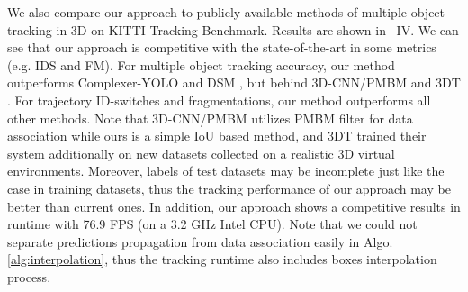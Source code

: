 \documentclass[letterpaper, 10pt, conference]{ieeeconf}  %
\begin{document}
We also compare our approach to publicly available methods of multiple object tracking in 3D on KITTI Tracking Benchmark. Results are shown in \tablename \, IV. We can see that our approach is competitive with the state-of-the-art in some metrics (e.g. IDS and FM). For multiple object tracking accuracy, our method outperforms Complexer-YOLO \cite{Simon_2019_CVPR_Workshops} and DSM \cite{frossard2018end}, but behind 3D-CNN/PMBM \cite{scheidegger2018mono} and 3DT \cite{Hu3DT19}. For trajectory ID-switches and fragmentations, our method outperforms all other methods. Note that 3D-CNN/PMBM utilizes PMBM filter for data association while ours is a simple IoU based method, and 3DT trained their system additionally on new datasets collected on a realistic 3D virtual environments. Moreover, labels of test datasets may be incomplete just like the case in training datasets, thus the tracking performance of our approach may be better than current ones. In addition, our approach shows a competitive results in runtime with 76.9 FPS (on a  3.2 GHz Intel CPU). Note that we could not separate predictions propagation from data association easily in Algo. \ref{alg:interpolation}, thus the tracking runtime also includes boxes interpolation process.
\begin{table}
	\caption*{TABLE III: Ablation study on KITTI Tracking validation datasets.}
	\label{label:result_tracking}
\end{table}
\end{document}
